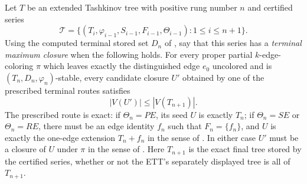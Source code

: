 \begin{definition}
Let \(T\) be an extended Tashkinov tree with positive rung number \(n\) and
certified series
\[
 \mathcal T=\{(T_i,\varphi_{i-1},S_{i-1},F_{i-1},\Theta_{i-1})
 :1\leq i\leq n+1\}.
\]
Using the computed terminal stored set \(D_n\) of
, say that this series has a
\emph{terminal maximum closure} when the following holds.  For every proper
partial \(k\)-edge-coloring \(\pi\) which leaves exactly the distinguished
edge \(e_0\) uncolored and is
\((T_n,D_n,\varphi_n)\)-stable, every candidate closure \(U'\) obtained by
one of the prescribed terminal routes satisfies
\[
                         |V(U')|\leq |V(T_{n+1})|.
\]
The prescribed route is exact: if \(\Theta_n=PE\), its seed \(U\) is
exactly \(T_n\); if \(\Theta_n=SE\) or \(\Theta_n=RE\), there must be an
edge identity \(f_n\) such that \(F_n=\{f_n\}\), and \(U\) is exactly the
one-edge extension \(T_n+f_n\) in the sense of
.  In either case \(U'\) must be a closure
of \(U\) under \(\pi\) in the sense of .
Here \(T_{n+1}\) is the exact final tree stored by the certified series,
whether or not the ETT's separately displayed tree is all of \(T_{n+1}\).
\end{definition}

